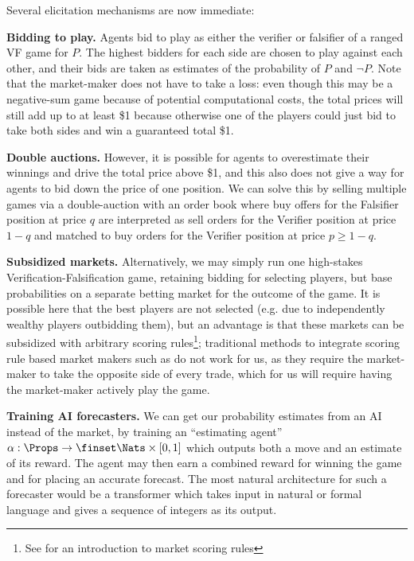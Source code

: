 Several elicitation mechanisms are now immediate:

\textbf{Bidding to play.} Agents bid to play as either the verifier or falsifier of a ranged VF game for $P$. The highest bidders for each side are chosen to play against each other, and their bids are taken as estimates of the probability of $P$ and $\lnot P$. Note that the market-maker does not have to take a loss: even though this may be a negative-sum game because of potential computational costs, the total prices will still add up to at least \$1 because otherwise one of the players could just bid to take both sides and win a guaranteed total \$1.

\textbf{Double auctions.} However, it is possible for agents to overestimate their winnings and drive the total price above \$1, and this also does not give a way for agents to bid down the price of one position. We can solve this by selling multiple games via a double-auction with an order book where buy offers for the Falsifier position at price $q$ are interpreted as sell orders for the Verifier position at price $1-q$ and matched to buy orders for the Verifier position at price $p\ge 1-q$.

\textbf{Subsidized markets.} Alternatively, we may simply run one high-stakes Verification-Falsification game, retaining bidding for selecting players, but base probabilities on a separate betting market for the outcome of the game. It is possible here that the best players are not selected (e.g. due to independently wealthy players outbidding them), but an advantage is that these markets can be subsidized with arbitrary scoring rules\footnote{See \citep{hansonLogarithmicMarketScoring2002} for an introduction to market scoring rules}; traditional methods to integrate scoring rule based market makers such as \citet{agrawalUnifiedFrameworkDynamic2011, chakrabortyPriceEvolutionContinuous2015} do not work for us, as they require the market-maker to take the opposite side of every trade, which for us will require having the market-maker actively play the game.

\textbf{Training AI forecasters.} We can get our probability estimates from an AI instead of the market, by training an ``estimating agent'' $\alpha:\Props\to\finset\Nats\times[0,1]$ which outputs both a move and an estimate of its reward. The agent may then earn a combined reward for winning the game and for placing an accurate forecast. The most natural architecture for such a forecaster would be a transformer which takes input in natural or formal language and gives a sequence of integers as its output.

